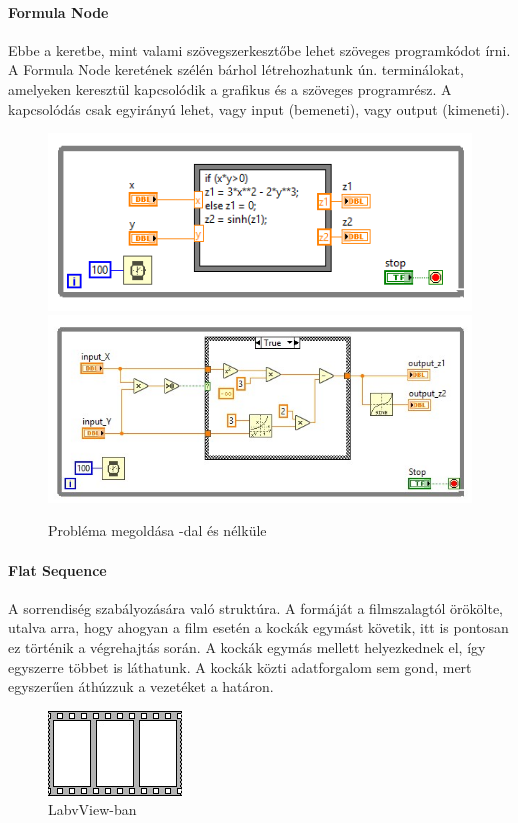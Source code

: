 \documentclass[../../main.tex]{subfiles}
\begin{document}
\paragraph*{Formula Node}
Ebbe a keretbe, mint valami szövegszerkesztőbe lehet szöveges programkódot
írni. A Formula Node keretének szélén bárhol létrehozhatunk ún. terminálokat,
amelyeken keresztül kapcsolódik a grafikus és a szöveges programrész.
A kapcsolódás csak egyirányú lehet, vagy input (bemeneti), vagy output (kimeneti).
\begin{figure}[htb]
  \centering
  \includegraphics[width=.75\textwidth]{../../static/lw/fnode1.png}
  \includegraphics[width=.75\textwidth]{../../static/lw/fnode2.jpeg}
  \caption{Probléma megoldása -dal és nélküle}
  \label{fig:lw/fnode}
\end{figure}

\paragraph*{Flat Sequence}
A sorrendiség szabályozására való struktúra. A formáját a filmszalagtól
örökölte, utalva arra, hogy ahogyan a film esetén a kockák egymást követik,
itt is pontosan ez történik a végrehajtás során. A kockák egymás mellett
helyezkednek el, így egyszerre többet is láthatunk. A kockák közti
adatforgalom sem gond, mert egyszerűen áthúzzuk a vezetéket a határon.
\begin{figure}[htb]
  \centering
  \includegraphics[width=.25\textwidth]{../../static/lw/fseq.jpeg}
  \caption{ LabvView-ban}
  \label{fig:lw/fseq}
\end{figure}
\end{document}
